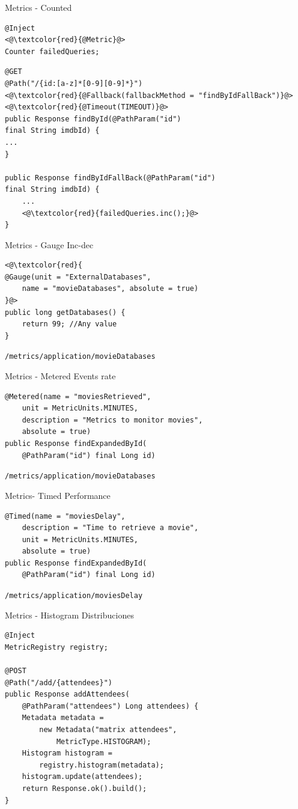 \documentclass[aspectratio=169]{beamer}
\begin{document}
\begin{frame}[fragile]{Metrics - Counted}
\begin{lstlisting}
@Inject
<@\textcolor{red}{@Metric}@>
Counter failedQueries;
\end{lstlisting}

\begin{lstlisting}
@GET
@Path("/{id:[a-z]*[0-9][0-9]*}")
<@\textcolor{red}{@Fallback(fallbackMethod = "findByIdFallBack")}@>
<@\textcolor{red}{@Timeout(TIMEOUT)}@>
public Response findById(@PathParam("id")
final String imdbId) {
...
}

public Response findByIdFallBack(@PathParam("id")
final String imdbId) {
	...
	<@\textcolor{red}{failedQueries.inc();}@>
}
\end{lstlisting}
\end{frame}

\begin{frame}[fragile]{Metrics - Gauge}
Inc-dec
\begin{lstlisting}
<@\textcolor{red}{
@Gauge(unit = "ExternalDatabases",
	name = "movieDatabases", absolute = true)
}@>
public long getDatabases() {
	return 99; //Any value
}
\end{lstlisting}

\lstinline|/metrics/application/movieDatabases|
\end{frame}

\begin{frame}[fragile]{Metrics - Metered}
Events rate
\begin{lstlisting}
@Metered(name = "moviesRetrieved",
	unit = MetricUnits.MINUTES,
	description = "Metrics to monitor movies",
	absolute = true)
public Response findExpandedById(
	@PathParam("id") final Long id)
\end{lstlisting}

\lstinline|/metrics/application/movieDatabases|
\end{frame}

\begin{frame}[fragile]{Metrics- Timed}
Performance
\begin{lstlisting}
@Timed(name = "moviesDelay",
	description = "Time to retrieve a movie",
	unit = MetricUnits.MINUTES,
	absolute = true)
public Response findExpandedById(
	@PathParam("id") final Long id)
\end{lstlisting}

\lstinline|/metrics/application/moviesDelay|
\end{frame}

\begin{frame}[fragile]{Metrics - Histogram}
Distribuciones
\begin{lstlisting}
@Inject
MetricRegistry registry;

@POST
@Path("/add/{attendees}")
public Response addAttendees(
	@PathParam("attendees") Long attendees) {
	Metadata metadata =
		new Metadata("matrix attendees",
			MetricType.HISTOGRAM);
	Histogram histogram =
		registry.histogram(metadata);
	histogram.update(attendees);
	return Response.ok().build();
}
\end{lstlisting}

\end{frame}
\end{document}
